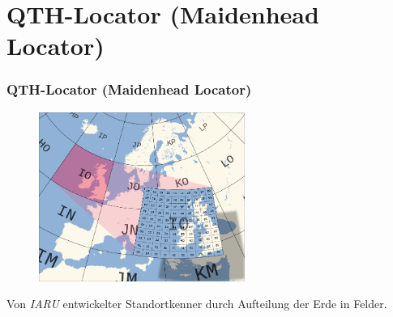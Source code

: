 \section[QTH-Locator]{QTH-Locator (Maidenhead Locator)}

\begin{frame}
  \frametitle{QTH-Locator (Maidenhead Locator)}

  \begin{center}
    \begin{figure}
      \includegraphics[width=0.6\textwidth,height=.65\textheight,keepaspectratio]{bv11/Maidenhead_grid_over_Europe.png}
    \end{figure}
  \end{center}

  Von \emph{IARU} entwickelter Standortkenner durch Aufteilung der Erde in Felder.

\end{frame}

